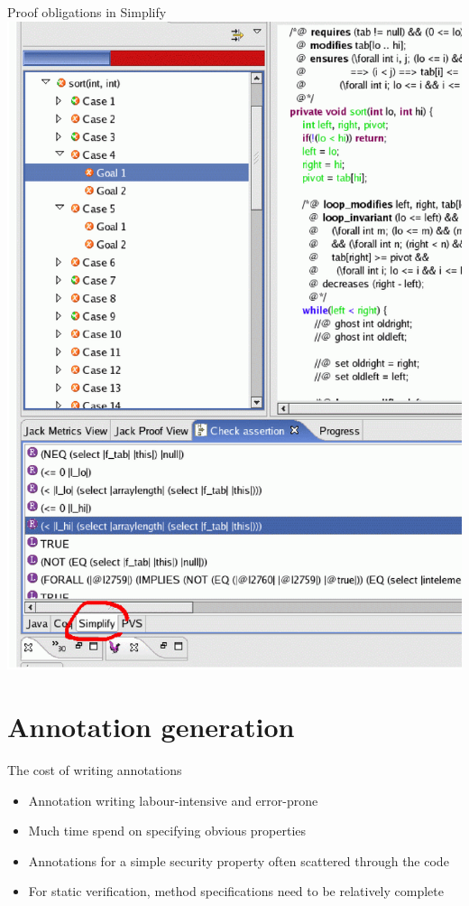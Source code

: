 \documentclass[final,nocolorBG,a4,mobius,nototal,pdf,slideColor]{prosper}
\begin{document}
\begin{slide}{Proof obligations in Simplify}
\vspace*{-1.5em}
\includegraphics[height=\textheight]{screen8.ps}
\end{slide}

\part{Annotation generation}

\begin{slide}{The cost of writing annotations}
\begin{itemize}
\item Annotation writing labour-intensive and error-prone
\item Much time spend on specifying obvious properties
\item Annotations for a simple security property often scattered
through the code
\item For static verification, method specifications need to be
relatively complete
\end{itemize}
\end{slide}
\end{document}

